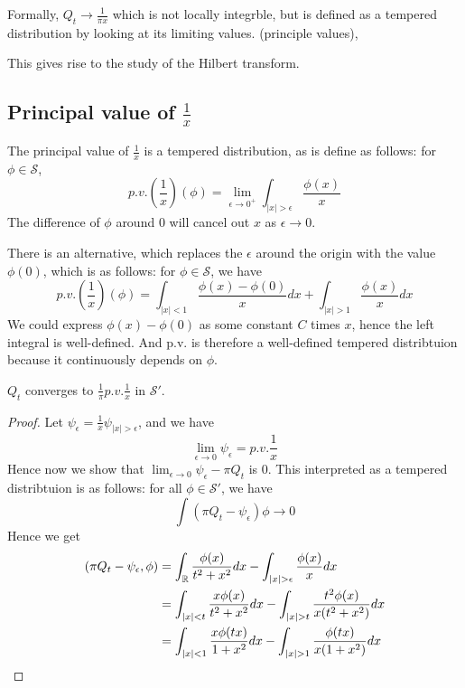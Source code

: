 Formally, $Q_t\to \frac{1}{\pi x}$ which is not locally integrble, but is defined as a tempered distribution by looking at its limiting values. (principle values), 
\begin{remark}
    This gives rise to the study of the Hilbert transform.
\end{remark}

\subsection{Principal value of $\frac{1}{x}$}
\begin{definition}
    The principal value of $\frac{1}{x}$ is a tempered distribution, as is define as follows: for $\phi\in\mathcal{S}$,
    \begin{equation*}
        p.v.\left(\frac{1}{x}\right)(\phi)=\lim_{\epsilon\to 0^+}\int_{|x|>\epsilon}\frac{\phi(x)}{x}
    \end{equation*}
    The difference of $\phi$ around 0 will cancel out $x$ as $\epsilon\to 0$.
\end{definition}

There is an alternative, which replaces the $\epsilon$ around the origin with the value $\phi(0)$, which is as follows: for $\phi\in\mathcal{S}$, we have
\begin{equation*}
    p.v.\left(\frac{1}{x}\right)(\phi)=\int_{|x|<1}\frac{\phi(x)-\phi(0)}{x}dx+\int_{|x|>1}\frac{\phi(x)}{x}dx
\end{equation*}
We could express $\phi(x)-\phi(0)$ as some constant $C$ times $x$, hence the left integral is well-defined. And p.v. is therefore a well-defined tempered distribtuion because it continuously depends on $\phi$.

\begin{proposition}
    $Q_t$ converges to $\frac{1}{\pi}p.v.\frac{1}{x}$ in $\mathcal{S}'$.
\end{proposition}
\begin{proof}
    Let $\psi_\epsilon=\frac{1}{x}\psi_{|x|>\epsilon}$, and we have
    \begin{equation*}
        \lim_{\epsilon\to 0}\psi_\epsilon=p.v.\frac{1}{x}
    \end{equation*}
    Hence now we show that $\lim_{\epsilon\to 0}\psi_\epsilon-\pi Q_t$ is 0. This interpreted as a tempered distribtuion is as follows: for all $\phi\in\mathcal{S}'$, we have
    \begin{equation*}
        \int (\pi Q_t-\psi_\epsilon)\phi\to 0
    \end{equation*}
    Hence we get
    \begin{align*}
        (\pi Q_t-\psi_\epsilon,\phi)&=\int_\R\frac{\phi(x)}{t^2+x^2}dx-\int_{|x|>\epsilon}\frac{\phi(x)}{x}dx\\
        &=\int_{|x|<t}\frac{x\phi(x)}{t^2+x^2}dx-\int_{|x|>t}\frac{t^2\phi(x)}{x(t^2+x^2)}dx\\
        &=\int_{|x|<1}\frac{x\phi(tx)}{1+x^2}dx-\int_{|x|>1}\frac{\phi(tx)}{x(1+x^2)}dx
    \end{align*}
\end{proof}


